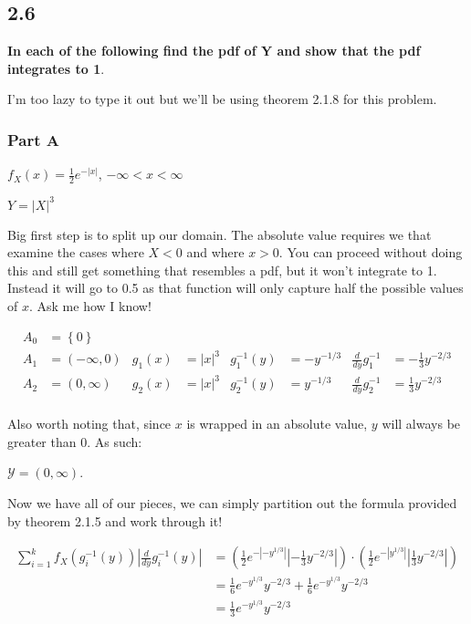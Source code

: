 \subsection*{2.6}

\textbf{In each of the following find the pdf of Y and show that the pdf integrates to 1}.

I'm too lazy to type it out but we'll be using theorem 2.1.8 for this problem.

\subsubsection*{Part A}

$f_X(x) = \frac{1}{2}e^{-|x|}$, $-\infty < x < \infty$

\noindent $Y = |X|^3$

Big first step is to split up our domain. The absolute value requires we that examine the cases where $X<0$ and where $x>0$. You can proceed without doing this and still get something that resembles a pdf, but it won't integrate to 1. Instead it will go to 0.5 as that function will only capture half the possible values of $x$. Ask me how I know!

\begin{align*}
	A_0 &= \left\{ 0 \right\} \\
	A_1 &= (-\infty, 0) & g_1(x) &= |x|^3 & g_1^{-1}(y) &= -y^{-1/3} & \frac{d}{dy} g_1^{-1} &= -\frac{1}{3}y^{-2/3} \\
	A_2 &= (0, \infty) & g_2(x) &= |x|^3 & g_2^{-1}(y) &= y^{-1/3} & \frac{d}{dy} g_2^{-1} &= \frac{1}{3}y^{-2/3} \\
\end{align*}

Also worth noting that, since $x$ is wrapped in an absolute value, $y$ will always be greater than 0. As such:

\noindent $\mathcal{Y} = (0, \infty)$.

Now we have all of our pieces, we can simply partition out the formula provided by theorem 2.1.5 and work through it!

\begin{align*}
	\sum_{i=1}^k f_X(g_i^{-1}(y)) \left| \frac{d}{dy}g_i^{-1}(y) \right| 
	&= \left( \frac{1}{2} e^{-|-y^{1/3}|} \left| -\frac{1}{3}y^{-2/3} \right| \right) 
	\cdot \left( \frac{1}{2} e^{-|y^{1/3}|} \left| \frac{1}{3}y^{-2/3} \right| \right) 
	\\
	&= \frac{1}{6} e^{-y^{1/3}}y^{-2/3} + \frac{1}{6} e^{-y^{1/3}}y^{-2/3} \\
	&= \frac{1}{3} e^{-y^{1/3}}y^{-2/3}
\end{align*}

